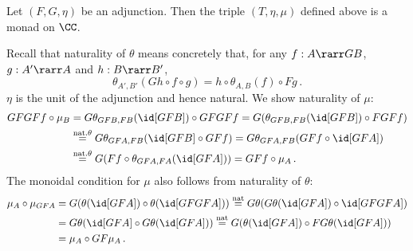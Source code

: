 \documentclass[12pt]{article}
\begin{document}
%
\begin{myproposition}
Let $(F,G,\eta)$ be an adjunction. Then the triple $(T,\eta,\mu)$ defined above is a monad on $\CC$.
\end{myproposition}
\proof
%
Recall that naturality of $\theta$ means concretely that, for any $f:A\rarr GB$, $g:A'\rarr A$ and $h:B\rarr B'$,
\[ \theta_{A',B'}(Gh\circ f\circ g) = h\circ\theta_{A,B}(f)\circ Fg\,. \]
$\eta$ is the unit of the adjunction and hence natural. We show naturality of $\mu$:
\begin{align*}
GFGFf\circ\mu_B &= G\theta_{GFB,FB}(\id[GFB])\circ GFGFf=G(\theta_{GFB,FB}(\id[GFB])\circ FGFf) \\
    &\overset{\text{nat.}\theta}{=} G\theta_{GFA,FB}(\id[GFB]\circ GFf) = G\theta_{GFA,FB}(GFf\circ\id[GFA]) \\
    &\overset{\text{nat.}\theta}{=} G(Ff\circ\theta_{GFA,FA}(\id[GFA])) = GFf\circ\mu_A\,.
\end{align*}
The monoidal condition for $\mu$ also follows from naturality of $\theta$:
\begin{align*}
\mu_A\circ\mu_{GFA} &= G(\theta(\id[GFA])\circ\theta(\id[GFGFA])) \overset{\text{nat}}{=} G\theta(G\theta(\id[GFA])\circ\id[GFGFA]) \\
    &= G\theta(\id[GFA]\circ G\theta(\id[GFA])) \overset{\text{nat}}{=} G(\theta(\id[GFA])\circ FG\theta(\id[GFA])) \\
    &= \mu_A\circ GF\mu_A\,.
\end{align*}
\end{document}
